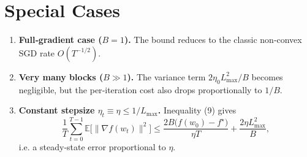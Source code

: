\documentclass{article}
\newcommand{\E}{\mathbb{E}}
\begin{document}
\section*{Special Cases}
\begin{enumerate}[label=(\alph*)]
\item \textbf{Full‑gradient case ($B=1$).}  The bound reduces to the classic
non‑convex SGD rate $O(T^{-1/2})$.
\item \textbf{Very many blocks ($B\gg 1$).}  The variance term
$2\eta_0 L_{\max}^{2}/B$ becomes negligible, but the per‑iteration
cost also drops proportionally to $1/B$.
\item \textbf{Constant stepsize $\eta_t\equiv \eta\le 1/L_{\max}$.}
  Inequality (9) gives
  \[
  \frac{1}{T}\sum_{t=0}^{T-1}\E\!\big[\|\nabla f(w_t)\|^{2}\big]
  \le
  \frac{2B\big(f(w_0)-f^\star\big)}{\eta T}
  + \frac{2\eta L_{\max}^{2}}{B},
  \]
  i.e. a steady‑state error proportional to $\eta$.
\end{enumerate}
\end{document}
